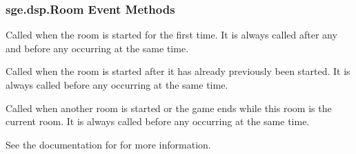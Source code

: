 \documentclass[letterpaper,10pt,english]{sphinxmanual}
\begin{document}
\subsubsection{sge.dsp.Room Event Methods}
\label{dsp:sge-dsp-room-event-methods}

\begin{fulllineitems}
\label{dsp:sge.dsp.Room.event_room_start}
Called when the room is started for the first time.  It is
always called after any 
and before any {\hyperref[dsp:sge.dsp.Object.event_create]{\emph{}}} occurring at
the same time.

\end{fulllineitems}


\begin{fulllineitems}
\label{dsp:sge.dsp.Room.event_room_resume}
Called when the room is started after it has already previously
been started.  It is always called before any
{\hyperref[dsp:sge.dsp.Object.event_create]{\emph{}}} occurring at the same time.

\end{fulllineitems}


\begin{fulllineitems}
\label{dsp:sge.dsp.Room.event_room_end}
Called when another room is started or the game ends while this
room is the current room.  It is always called before any
 occurring at the same time.

\end{fulllineitems}


\begin{fulllineitems}
\label{dsp:sge.dsp.Room.event_step}
See the documentation for {\hyperref[dsp:sge.dsp.Game.event_step]{\emph{}}} for
more information.

\end{fulllineitems}
\end{document}

